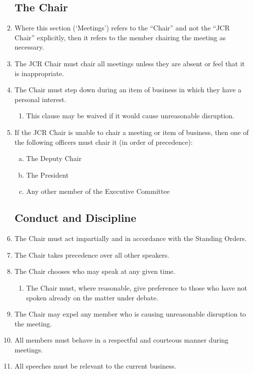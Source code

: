 \documentclass[12pt]{article}
\begin{document}
\begin{enumerate}
    \subsection{The Chair}
    \item Where this section (‘Meetings’) refers to the “Chair” and not the “JCR Chair” explicitly, then it refers to the member chairing the meeting as necessary.
    \item The JCR Chair must chair all meetings unless they are absent or feel that it is inappropriate.
    \item The Chair must step down during an item of business in which they have a personal interest.
    \begin{enumerate}
        \item This clause may be waived if it would cause unreasonable disruption.
    \end{enumerate}
    \item If the JCR Chair is unable to chair a meeting or item of business, then one of the following officers must chair it (in order of precedence):
    \begin{enumerate}[(a)]
        \item The Deputy Chair
        \item The President
        \item Any other member of the Executive Committee
    \end{enumerate}
    \subsection{Conduct and Discipline}
    \item The Chair must act impartially and in accordance with the Standing Orders.
    \item The Chair takes precedence over all other speakers.
    \item The Chair chooses who may speak at any given time.
    \begin{enumerate}
        \item The Chair must, where reasonable, give preference to those who have not spoken already on the matter under debate.
    \end{enumerate}
    \item The Chair may expel any member who is causing unreasonable disruption to the meeting.
    \item All members must behave in a respectful and courteous manner during meetings.
    \item All speeches must be relevant to the current business.

\end{enumerate}
\end{document}

